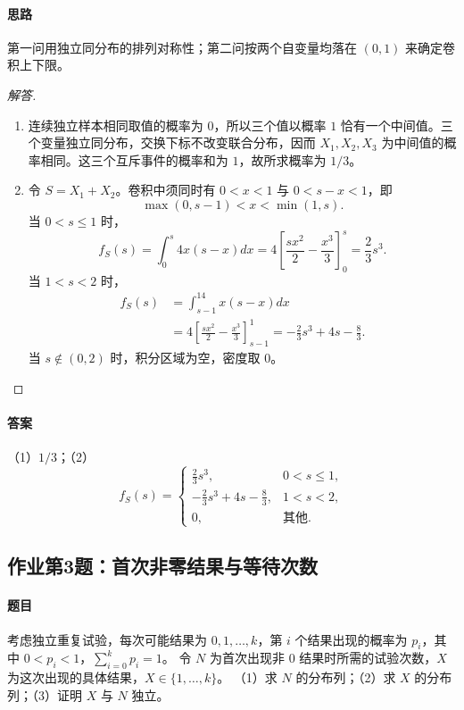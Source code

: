 \paragraph{思路}第一问用独立同分布的排列对称性；第二问按两个自变量均落在 $(0,1)$ 来确定卷积上下限。
\begin{proof}[解答]
\begin{enumerate}
\item 连续独立样本相同取值的概率为 $0$，所以三个值以概率 $1$ 恰有一个中间值。三个变量独立同分布，交换下标不改变联合分布，因而 $X_1,X_2,X_3$ 为中间值的概率相同。这三个互斥事件的概率和为 $1$，故所求概率为 $1/3$。
\item 令 $S=X_1+X_2$。卷积中须同时有 $0<x<1$ 与 $0<s-x<1$，即
\[
\max(0,s-1)<x<\min(1,s).
\]
当 $0<s\leq1$ 时，
\[
f_S(s)=\int_0^s4x(s-x)dx
=4\left[\frac{s x^2}{2}-\frac{x^3}{3}\right]_0^s
=\frac23s^3.
\]
当 $1<s<2$ 时，
\begin{align*}
f_S(s)&=\int_{s-1}^14x(s-x)dx\\
&=4\left[\frac{s x^2}{2}-\frac{x^3}{3}\right]_{s-1}^1
=-\frac23s^3+4s-\frac83.
\end{align*}
当 $s\notin(0,2)$ 时，积分区域为空，密度取 $0$。
\end{enumerate}
\end{proof}
\paragraph{答案}（1）$1/3$；（2）
\[
f_S(s)=\begin{cases}\frac23s^3,&0<s\leq1,\\-\frac23s^3+4s-\frac83,&1<s<2,\\0,&\text{其他}.\end{cases}
\]

\subsection{作业第3题：首次非零结果与等待次数}\label{ex:w11-h3}
\paragraph{题目}
考虑独立重复试验，每次可能结果为 $0,1,\ldots,k$，第 $i$ 个结果出现的概率为 $p_i$，其中 $0<p_i<1$，$\sum_{i=0}^kp_i=1$。
令 $N$ 为首次出现非 $0$ 结果时所需的试验次数，$X$ 为这次出现的具体结果，$X\in\{1,\ldots,k\}$。
（1）求 $N$ 的分布列；（2）求 $X$ 的分布列；（3）证明 $X$ 与 $N$ 独立。
